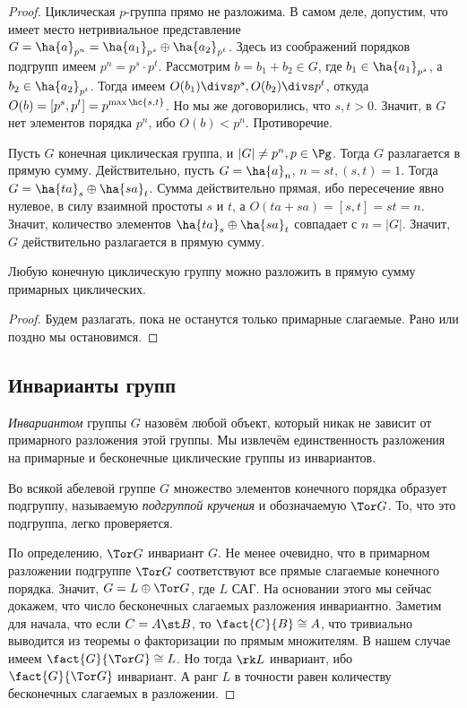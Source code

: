\documentclass[a4paper]{article}
\begin{document}
\begin{proof}
 Циклическая $p$-группа прямо не разложима. В самом  деле, допустим, что имеет место нетривиальное
представление $G=\ha{a}_{p^n}=\ha{a_1}_{p^s}\oplus\ha{a_2}_{p^t}$. Здесь из соображений порядков подгрупп
имеем $p^n=p^s\cdot p^t$. Рассмотрим $b = b_1+b_2\in G$, где $b_1 \in \ha{a_1}_{p^s}$, а $b_2 \in
\ha{a_2}_{p^t}$. Тогда имеем $O(b_1)\divs p^s, O(b_2)\divs p^t$, откуда $O(b)=[p^s,p^t]=p^{\max\hc{s,t}}$. Но
мы же договорились, что $s, t>0$. Значит, в $G$ нет элементов порядка $p^n$, ибо $O(b) < p^n$. Противоречие.

 Пусть $G$ конечная циклическая группа, и $|G| \neq p^n, p \in \Pg$.  Тогда $G$ разлагается в прямую
сумму. Действительно, пусть $G=\ha{a}_n$, $n=st, (s,t)=1$. Тогда $G=\ha{ta}_s\oplus\ha{sa}_t$. Сумма
действительно прямая, ибо пересечение явно нулевое, в силу взаимной простоты $s$ и $t$, а
$O(ta+sa)=[s,t]=st=n$. Значит, количество элементов $\ha{ta}_s\oplus\ha{sa}_t$ совпадает с $n=|G|$. Значит,
$G$ действительно разлагается в прямую сумму.

\begin{imp}
Любую конечную циклическую группу можно разложить в прямую сумму примарных циклических.
\end{imp}
\begin{proof}
Будем разлагать, пока не останутся только примарные слагаемые. Рано или поздно мы остановимся.
\end{proof}

\subsection{Инварианты групп}

\begin{df}
\emph{Инвариантом} группы $G$ назовём любой объект, который никак не зависит от примарного разложения этой
группы. Мы извлечём единственность разложения на примарные и бесконечные циклические группы из инвариантов.
\end{df}

\begin{df}
Во всякой абелевой группе $G$ множество элементов конечного порядка образует  подгруппу, называемую
\emph{подгруппой кручения} и обозначаемую $\Tor G$. То, что это подгруппа, легко
проверяется.
\end{df}

По определению, $\Tor G$ инвариант $G$. Не менее очевидно, что в примарном разложении подгруппе
$\Tor G$ соответствуют все прямые слагаемые конечного порядка. Значит, $G=L\oplus \Tor G$, где $L$ САГ. На
основании этого мы сейчас докажем, что число бесконечных слагаемых разложения инвариантно. Заметим для
начала, что если $C=A\st B$, то $\fact{C}{B} \cong A$, что тривиально выводится из теоремы о факторизации по
прямым множителям. В нашем случае имеем $\fact{G}{\Tor G} \cong L$. Но тогда $\rk L$ инвариант, ибо
$\fact{G}{\Tor G}$ инвариант. А ранг $L$ в точности равен количеству бесконечных слагаемых в разложении.


\end{proof}
\end{document}

